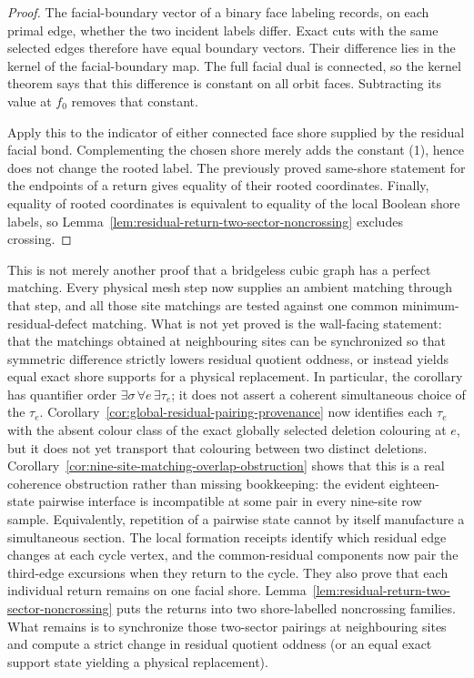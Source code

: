 \begin{proof}
The facial-boundary vector of a binary face labeling records, on each primal
edge, whether the two incident labels differ.  Exact cuts with the same
selected edges therefore have equal boundary vectors.  Their difference lies
in the kernel of the facial-boundary map.  The full facial dual is connected,
so the kernel theorem says that this difference is constant on all orbit
faces.  Subtracting its value at \(f_0\) removes that constant.

Apply this to the indicator of either connected face shore supplied by the
residual facial bond.  Complementing the chosen shore merely adds the constant
(1), hence does not change the rooted label.  The previously proved
same-shore statement for the endpoints of a return gives equality of their
rooted coordinates.  Finally, equality of rooted coordinates is equivalent
to equality of the local Boolean shore labels, so
Lemma~\ref{lem:residual-return-two-sector-noncrossing} excludes crossing.
\end{proof}

This is not merely another proof that a bridgeless cubic graph has a perfect
matching.  Every physical mesh step now supplies an ambient matching through
that step, and all those site matchings are tested against one common
minimum-residual-defect matching.  What is not yet proved is the wall-facing
statement: that the matchings obtained at neighbouring sites can be
synchronized so that symmetric difference strictly lowers residual quotient
oddness, or instead yields equal exact shore supports for a physical
replacement.  In particular, the corollary has quantifier order
\(\exists\sigma\,\forall e\,\exists\tau_e\); it does not assert a coherent
simultaneous choice of the \(\tau_e\).  Corollary~\ref{cor:global-residual-pairing-provenance}
now identifies each \(\tau_e\) with the absent colour class of the exact
globally selected deletion colouring at \(e\), but it does not yet transport
that colouring between two distinct deletions.  Corollary~\ref{cor:nine-site-matching-overlap-obstruction}
shows that this is a real coherence obstruction rather than missing
bookkeeping: the evident eighteen-state pairwise interface is incompatible
at some pair in every nine-site row sample.  Equivalently, repetition of a
pairwise state cannot by itself manufacture a simultaneous section.  The
local formation receipts identify
which residual edge changes at each cycle vertex, and the common-residual
components now pair the third-edge excursions when they return to the cycle.
They also prove that each individual return remains on one facial shore.
Lemma~\ref{lem:residual-return-two-sector-noncrossing} puts the returns into
two shore-labelled noncrossing families.  What remains is to synchronize
those two-sector pairings at neighbouring sites and compute a strict change
in residual quotient oddness (or an equal exact support state yielding a
physical replacement).

